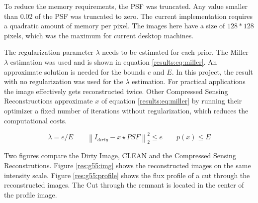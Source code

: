 To reduce the memory requirements, the PSF was truncated. Any value smaller than 0.02 of the PSF was truncated to zero. The current implementation requires a quadratic amount of memory per pixel. The images here have a size of $128*128$ pixels, which was the maximum for current desktop machines.

The regularization parameter $\lambda$ needs to be estimated for each prior. The Miller\cite{miller1970least} $\lambda$ estimation was used and is shown in equation \eqref{results:eq:miller}. An approximate solution is needed for the bounds $e$ and $E$. In this project, the result with no regularization was used for the $\lambda$ estimation. For practical applications the image effectively gets reconstructed twice. Other Compressed Sensing Reconstructions approximate $x$ of equation \eqref{results:eq:miller} by running their optimizer a fixed number of iterations without regularization, which reduces the computational costs.

\begin{equation}\label{results:eq:miller}
	\lambda = e / E \qquad  \left \| I_{dirty} - x \star PSF \right \|_2^2 \le e \qquad p(x) \le E
\end{equation}

Two figures compare the Dirty Image, CLEAN and the Compressed Sensing Reconstrutions. Figure \ref{res:g55:img} shows the reconstructed images on the same intensity scale. Figure \ref{res:g55:profile} shows the flux profile of a cut through the reconstructed images. The Cut through the remnant is located in the center of the profile image.

